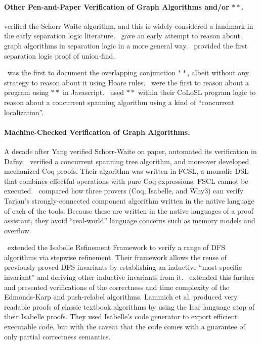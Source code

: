 \paragraph{Other Pen-and-Paper Verification of Graph Algorithms and/or $**$.}

\citet{hongseok:phd} verified the Schorr-Waite algorithm, and this 
is widely considered a landmark in the early separation logic literature. 
\citet{bornat:aliasing04}~gave an early attempt to reason about graph algorithms 
in separation logic in a more general way. 
\citet{neelthesis}~provided the first separation logic proof of union-find.

\citet{rey-slnotes}~was the first to document the overlapping 
conjunction $**$, albeit without any strategy to reason about it using Hoare rules. 
\citet{gardnerms12}~were the first to reason about a program using $**$ in 
Javascript. 
\citet{raadvg15}~used $**$ within their CoLoSL program logic to reason about 
a concurrent spanning algorithm using a kind of ``concurrent localization''.


\paragraph{Machine-Checked Verification of Graph Algorithms.}
A decade after Yang verified Schorr-Waite on paper, \citet{leino10} automated 
its verification in Dafny. 
\citet{ilya-graphs}~verified a concurrent spanning tree algorithm, and 
moreover developed mechanized Coq proofs. Their algorithm was written in FCSL, 
a monadic DSL that combines effectful operations with pure Coq expressions; 
FSCL cannot be executed. 
\citet{chen18}~compared how three provers (Coq, Isabelle, and Why3) can 
verify Tarjan’s strongly-connected component algorithm written in the native 
language of each of the tools. Because these are written in the native languages 
of a proof assistant, they avoid “real-world” language concerns such as 
memory models and overflow.

\citet{lamneu15}~extended the Isabelle Refinement Framework to verify a range of 
DFS algorithms via stepwise refinement.
Their framework allows the reuse of previously-proved DFS 
invariants by establishing an inductive
``most specific invariant'' and deriving other inductive invariants from it.
\citet{lamsef19}~extended this further and presented verifications of 
the correctness and time complexity of the Edmonds-Karp and push-relabel
algorithms. Lammich et al. produced very readable proofs of classic 
textbook algorithms by using the Isar language atop of their Isabelle proofs.
They used Isabelle's code generator to export efficient executable code, 
but with the caveat that the code comes with a guarantee of only 
partial correctness semantics.

